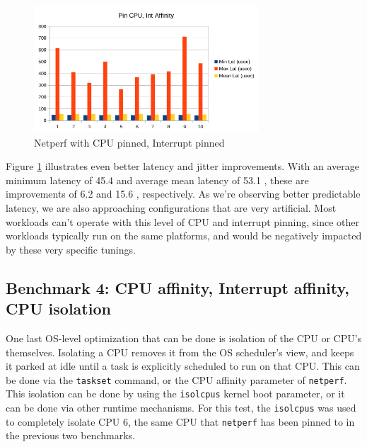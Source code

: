 \documentclass[letterpaper]{article}
\begin{document}
{{\begin{figure}[h]
\includegraphics[width=3.31in]{netperf-cpu-pin-int-affinity.png}
\caption{Netperf with CPU pinned, Interrupt pinned}
\label{netperf-cpu-pin-int-affinity}
\end{figure}

Figure \ref{netperf-cpu-pin-int-affinity} illustrates even better latency and jitter improvements. With an average minimum latency of 45.4  and average mean latency of 53.1 , these are improvements of 6.2  and 15.6 , respectively.
\newline
\newline
As we're observing better predictable latency, we are also approaching configurations that are very artificial. Most workloads can't operate with this level of CPU and interrupt pinning, since other workloads typically run on the same platforms, and would be negatively impacted by these very specific tunings.

\subsection{Benchmark 4: CPU affinity, Interrupt affinity, CPU isolation}
One last OS-level optimization that can be done is isolation of the CPU or CPU's themselves.  Isolating a CPU removes it from the OS scheduler's view, and keeps it parked at idle until a task is explicitly scheduled to run on that CPU.  This can be done via the {\small \texttt{taskset}} command, or the CPU affinity parameter of {\small \texttt{netperf}}.
\newline
\newline
This isolation can be done by using the {\small \texttt{isolcpus}} kernel boot parameter, or it can be done via other runtime mechanisms. For this test, the {\small \texttt{isolcpus}} was used to completely isolate CPU 6, the same CPU that {\small \texttt{netperf}} has been pinned to in the previous two benchmarks.

}}
\end{document}
